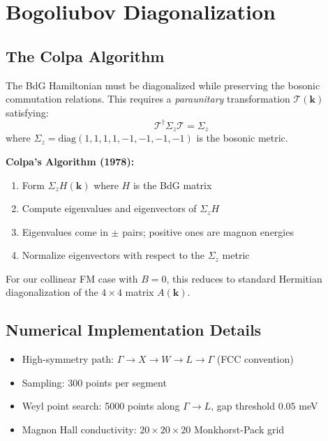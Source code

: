 \documentclass[11pt,letterpaper]{article}
\begin{document}
\section{Bogoliubov Diagonalization}

\subsection{The Colpa Algorithm}

\begin{derivation}[title={Paraunitary Diagonalization}]
The BdG Hamiltonian must be diagonalized while preserving the bosonic commutation relations. This requires a \emph{paraunitary} transformation $\mathcal{T}(\bm{k})$ satisfying:
\begin{equation}
\mathcal{T}^\dagger \Sigma_z \mathcal{T} = \Sigma_z
\end{equation}
where $\Sigma_z = \text{diag}(1,1,1,1,-1,-1,-1,-1)$ is the bosonic metric.

\textbf{Colpa's Algorithm (1978):}
\begin{enumerate}
    \item Form $\Sigma_z H(\bm{k})$ where $H$ is the BdG matrix
    \item Compute eigenvalues and eigenvectors of $\Sigma_z H$
    \item Eigenvalues come in $\pm$ pairs; positive ones are magnon energies
    \item Normalize eigenvectors with respect to the $\Sigma_z$ metric
\end{enumerate}

For our collinear FM case with $B = 0$, this reduces to standard Hermitian diagonalization of the $4 \times 4$ matrix $A(\bm{k})$.
\end{derivation}

\subsection{Numerical Implementation Details}

\begin{itemize}
    \item High-symmetry path: $\Gamma \to X \to W \to L \to \Gamma$ (FCC convention)
    \item Sampling: 300 points per segment
    \item Weyl point search: 5000 points along $\Gamma \to L$, gap threshold $0.05$ meV
    \item Magnon Hall conductivity: $20 \times 20 \times 20$ Monkhorst-Pack grid
\end{itemize}
\end{document}
